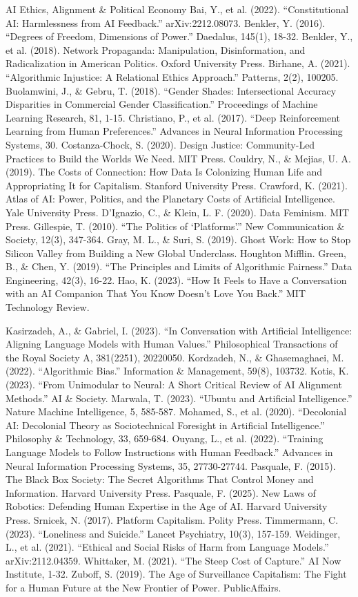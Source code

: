 \documentclass[11pt,a4paper,openany]{book}
\begin{document}
AI Ethics, Alignment \& Political Economy Bai, Y., et al. (2022). “Constitutional AI: Harmlessness from AI Feedback.” arXiv:2212.08073. Benkler, Y. (2016). “Degrees of Freedom, Dimensions of Power.” Daedalus, 145(1), 18-32. Benkler, Y., et al. (2018). Network Propaganda: Manipulation, Disinformation, and Radicalization in American Politics. Oxford University Press. Birhane, A. (2021). “Algorithmic Injustice: A Relational Ethics Approach.” Patterns, 2(2), 100205. Buolamwini, J., \& Gebru, T. (2018). “Gender Shades: Intersectional Accuracy Disparities in Commercial Gender Classification.” Proceedings of Machine Learning Research, 81, 1-15. Christiano, P., et al. (2017). “Deep Reinforcement Learning from Human Preferences.” Advances in Neural Information Processing Systems, 30. Costanza-Chock, S. (2020). Design Justice: Community-Led Practices to Build the Worlds We Need. MIT Press. Couldry, N., \& Mejias, U. A. (2019). The Costs of Connection: How Data Is Colonizing Human Life and Appropriating It for Capitalism. Stanford University Press. Crawford, K. (2021). Atlas of AI: Power, Politics, and the Planetary Costs of Artificial Intelligence. Yale University Press. D’Ignazio, C., \& Klein, L. F. (2020). Data Feminism. MIT Press. Gillespie, T. (2010). “The Politics of ‘Platforms’.” New Communication \& Society, 12(3), 347-364. Gray, M. L., \& Suri, S. (2019). Ghost Work: How to Stop Silicon Valley from Building a New Global Underclass. Houghton Mifflin. Green, B., \& Chen, Y. (2019). “The Principles and Limits of Algorithmic Fairness.” Data Engineering, 42(3), 16-22. Hao, K. (2023). “How It Feels to Have a Conversation with an AI Companion That You Know Doesn’t Love You Back.” MIT Technology Review.

Kasirzadeh, A., \& Gabriel, I. (2023). “In Conversation with Artificial Intelligence: Aligning Language Models with Human Values.” Philosophical Transactions of the Royal Society A, 381(2251), 20220050. Kordzadeh, N., \& Ghasemaghaei, M. (2022). “Algorithmic Bias.” Information \& Management, 59(8), 103732. Kotis, K. (2023). “From Unimodular to Neural: A Short Critical Review of AI Alignment Methods.” AI \& Society. Marwala, T. (2023). “Ubuntu and Artificial Intelligence.” Nature Machine Intelligence, 5, 585-587. Mohamed, S., et al. (2020). “Decolonial AI: Decolonial Theory as Sociotechnical Foresight in Artificial Intelligence.” Philosophy \& Technology, 33, 659-684. Ouyang, L., et al. (2022). “Training Language Models to Follow Instructions with Human Feedback.” Advances in Neural Information Processing Systems, 35, 27730-27744. Pasquale, F. (2015). The Black Box Society: The Secret Algorithms That Control Money and Information. Harvard University Press. Pasquale, F. (2025). New Laws of Robotics: Defending Human Expertise in the Age of AI. Harvard University Press. Srnicek, N. (2017). Platform Capitalism. Polity Press. Timmermann, C. (2023). “Loneliness and Suicide.” Lancet Psychiatry, 10(3), 157-159. Weidinger, L., et al. (2021). “Ethical and Social Risks of Harm from Language Models.” arXiv:2112.04359. Whittaker, M. (2021). “The Steep Cost of Capture.” AI Now Institute, 1-32. Zuboff, S. (2019). The Age of Surveillance Capitalism: The Fight for a Human Future at the New Frontier of Power. PublicAffairs.
\end{document}
